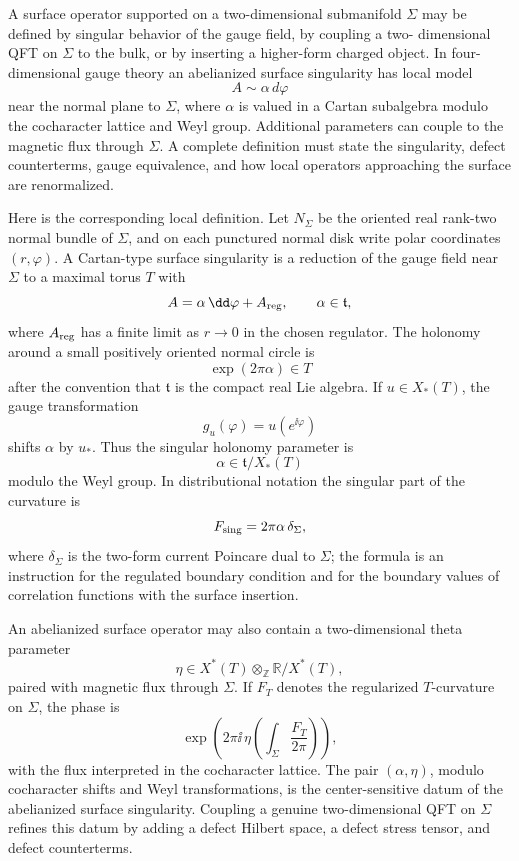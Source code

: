 A surface operator supported on a two-dimensional submanifold \(\Sigma\) may
be defined by singular behavior of the gauge field, by coupling a two-
dimensional QFT on \(\Sigma\) to the bulk, or by inserting a higher-form
charged object.  In four-dimensional gauge theory an abelianized surface
singularity has local model
\[
  A\sim \alpha\, d\varphi
\]
near the normal plane to \(\Sigma\), where \(\alpha\) is valued in a Cartan
subalgebra modulo the cocharacter lattice and Weyl group.  Additional
parameters can couple to the magnetic flux through \(\Sigma\).  A complete
definition must state the singularity, defect counterterms, gauge
equivalence, and how local operators approaching the surface are
renormalized.

Here is the corresponding local definition.  Let \(N_\Sigma\) be the
oriented real rank-two normal bundle of \(\Sigma\), and on each punctured
normal disk write polar coordinates \((r,\varphi)\).  A Cartan-type surface
singularity is a reduction of the gauge field near \(\Sigma\) to a maximal
torus \(T\) with
\begin{equation}
  A=\alpha\,\dd\varphi+A_{\rm reg},
  \qquad
  \alpha\in\mathfrak t,
  \label{eq:surface-alpha-singularity}
\end{equation}
where \(A_{\rm reg}\) has a finite limit as \(r\to0\) in the chosen regulator.
The holonomy around a small positively oriented normal circle is
\[
  \exp(2\pi\alpha)\in T
\]
after the convention that \(\mathfrak t\) is the compact real Lie algebra.
If \(u\in X_*(T)\), the gauge transformation
\[
  g_u(\varphi)=u(e^{\ii\varphi})
\]
shifts \(\alpha\) by \(u_*\).  Thus the singular holonomy parameter is
\[
  \alpha\in\mathfrak t/X_*(T)
\]
modulo the Weyl group.  In distributional notation the singular part of the
curvature is
\[
  F_{\rm sing}=2\pi \alpha\,\delta_\Sigma,
\]
where \(\delta_\Sigma\) is the two-form current Poincare dual to \(\Sigma\);
the formula is an instruction for the regulated boundary condition and for
the boundary values of correlation functions with the surface insertion.

An abelianized surface operator may also contain a two-dimensional theta
parameter
\[
  \eta\in X^*(T)\otimes_{\mathbb Z}\mathbb R/X^*(T),
\]
paired with magnetic flux through \(\Sigma\).  If \(F_T\) denotes the
regularized \(T\)-curvature on \(\Sigma\), the phase is
\[
  \exp\!\left(2\pi\ii\,\eta\!\left(\int_\Sigma\frac{F_T}{2\pi}\right)\right),
\]
with the flux interpreted in the cocharacter lattice.  The pair
\((\alpha,\eta)\), modulo cocharacter shifts and Weyl transformations, is the
center-sensitive datum of the abelianized surface singularity.  Coupling a
genuine two-dimensional QFT on \(\Sigma\) refines this datum by adding a
defect Hilbert space, a defect stress tensor, and defect counterterms.

